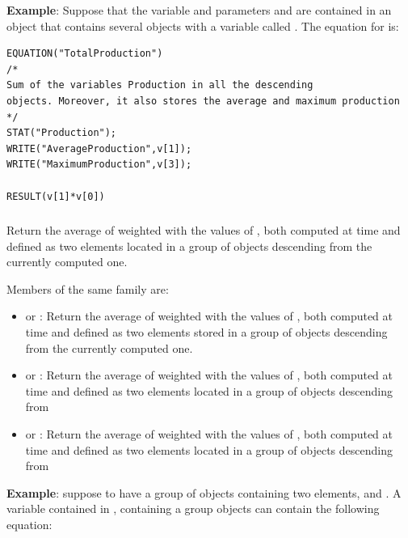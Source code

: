 \documentclass [11pt,a4paper] {book}
\begin{document}
\textbf{Example}: Suppose that the variable  and parameters
 and  are contained in an object
 that contains several objects  with a variable called
. The equation for  is:

\small
\begin{verbatim}
EQUATION("TotalProduction")
/*
Sum of the variables Production in all the descending
objects. Moreover, it also stores the average and maximum production
*/
STAT("Production");
WRITE("AverageProduction",v[1]);
WRITE("MaximumProduction",v[3]);

RESULT(v[1]*v[0])
\end{verbatim}
\normalsize

\subsubsection{ }
Return the average of  weighted with the values of , both computed at time
 and defined as two elements located in a group of objects descending from the currently
computed one.

Members of the same family are:

\begin{itemize}
  \item {} or : Return the average of  weighted with the values of , both computed at time  and defined as two elements stored in a group of objects descending from the currently computed one.

  \item {} or : Return the average of  weighted with the values of , both computed at time  and defined as two elements located in a group of objects descending from  
  
  \item {} or : Return the average of  weighted with the values of , both computed at time  and defined as two elements located in a group of objects descending from 
\end{itemize}


\textbf{Example}: suppose to have a group of objects  containing two elements,
 and . A variable contained in , containing a group objects  can contain the following equation:
\end{document}
